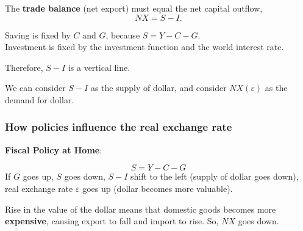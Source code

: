 \documentclass[12pt]{article}
\begin{document}
The {\textbf {trade balance}} (net export) must equal the net capital outflow,
\begin{equation*}
NX = S - I.
\end{equation*}

Saving is fixed by $ C $ and $ G $, because $ S = Y - C - G $.\\
Investment is fixed by the investment function and the world interest rate.

Therefore, $ S - I $ is a vertical line.

\begin{figure}[H]
\end{figure}

We can consider $ S - I $ as the supply of dollar, and consider $ NX(\varepsilon) $
as the demand for dollar.



\subsubsection{How policies influence the real exchange rate}
{\textbf {Fiscal Policy at Home}}:

\begin{equation*}
S = Y - C - G
\end{equation*}
If $ G $ goes up, $ S $ goes down, $ S - I $ shift to the left (supply of dollar
goes down), real exchange rate $ \varepsilon $ goes up (dollar becomes more valuable).

Rise in the value of the dollar means that domestic goods becomes more {\textbf {
expensive}}, causing export to fall and import to rise. So, $ NX $ goes down.
\end{document}
